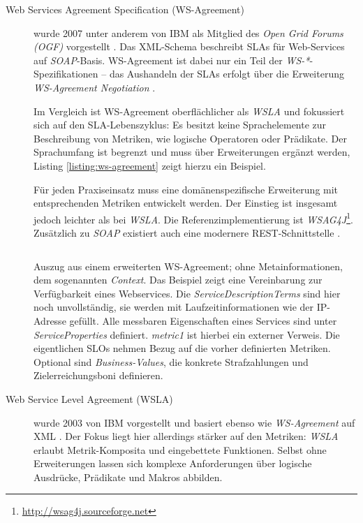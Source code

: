 \begin{description}
	\item[Web Services Agreement Specification (WS-Agreement)] wurde 2007 unter anderem von IBM als Mitglied des \emph{Open Grid Forums (OGF)} vorgestellt \cite{ogf:2011:ws-agreement}. Das XML-Schema beschreibt SLAs für Web-Services auf \emph{SOAP}-Basis. WS-Agreement ist dabei nur ein Teil der \emph{WS-*}-Spezifikationen -- das Aushandeln der SLAs erfolgt über die Erweiterung \emph{WS-Agreement Negotiation} \cite{ogf:2011:ws-negotiation}.
	
	Im Vergleich ist WS-Agreement oberflächlicher als \emph{WSLA} und fokussiert sich auf den SLA-Lebenszyklus: Es besitzt keine Sprachelemente zur Beschreibung von Metriken, wie logische Operatoren oder Prädikate. Der Sprachumfang ist begrenzt und muss über Erweiterungen ergänzt werden, Listing \ref{listing:ws-agreement} zeigt hierzu ein Beispiel.
	
	Für jeden Praxiseinsatz muss eine domänenspezifische Erweiterung mit entsprechenden Metriken entwickelt werden. Der Einstieg ist insgesamt jedoch leichter als bei \emph{WSLA}. Die Referenzimplementierung ist \emph{WSAG4J}\footnote{\url{http://wsag4j.sourceforge.net}}. Zusätzlich zu \emph{SOAP} existiert auch eine modernere REST-Schnittstelle \cite{feigenbutz:2014:wsag-rest-performance}.

	\begin{listing}[ht]
		\inputminted[firstline=16, lastline=34]{xml}{./src/WS-Agreement.sample.xml}
		\caption{Auszug aus einem erweiterten WS-Agreement; ohne Metainformationen, dem sogenannten \emph{Context}. Das Beispiel zeigt eine Vereinbarung zur Verfügbarkeit eines Webservices. Die \emph{ServiceDescriptionTerms} sind hier noch unvollständig, sie werden mit Laufzeitinformationen wie der IP-Adresse gefüllt. Alle messbaren Eigenschaften eines Services sind unter \emph{ServiceProperties} definiert. \emph{metric1} ist hierbei ein externer Verweis. Die eigentlichen SLOs nehmen Bezug auf die vorher definierten Metriken. Optional sind \emph{Business-Values}, die konkrete Strafzahlungen und Zielerreichungsboni definieren.}
		\label{listing:ws-agreement}
	\end{listing}	
	
	\item[Web Service Level Agreement (WSLA)] wurde 2003 von IBM vorgestellt und basiert ebenso wie \emph{WS-Agreement} auf XML \cite{ludwig:2003:wsla, keller:2003:wsla}. Der Fokus liegt hier allerdings stärker auf den Metriken: \emph{WSLA} erlaubt Metrik-Komposita und eingebettete Funktionen. Selbst ohne Erweiterungen lassen sich komplexe Anforderungen über logische Ausdrücke, Prädikate und Makros abbilden.
	

\end{description}
